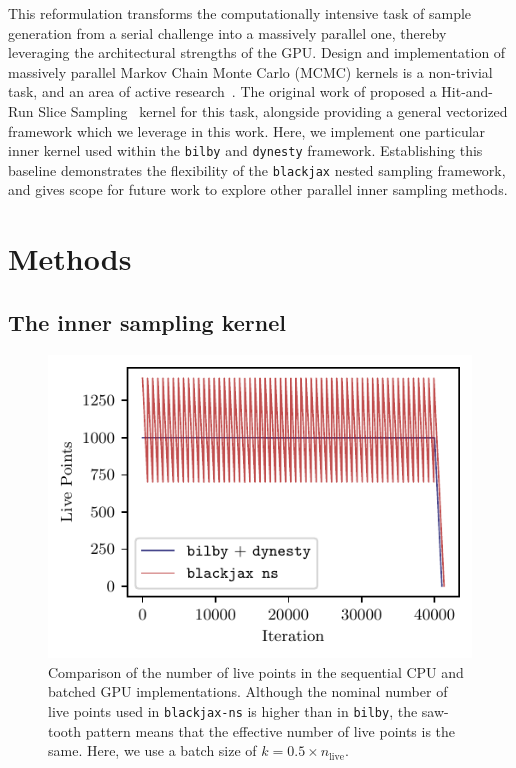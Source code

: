 \documentclass[fleqn,usenatbib]{mnras}
\begin{document}
This reformulation transforms the computationally intensive task of
sample generation from a serial challenge into a massively parallel one,
thereby leveraging the architectural strengths of the GPU. 
Design and implementation of massively parallel Markov Chain Monte Carlo 
(MCMC) kernels is a non-trivial task, and an area of active 
research~\citep{pmlr-v151-hoffman22a,pmlr-v130-hoffman21a}. 
The original work of \cite{yallup2025nested} proposed a 
Hit-and-Run Slice Sampling~\citep{Neal2003_slice} kernel for this task, 
alongside providing a general vectorized framework which we leverage in this work. 
Here, we implement one particular inner kernel used within the \texttt{bilby}
and \texttt{dynesty} framework.
Establishing this baseline demonstrates the flexibility of the \texttt{blackjax} 
nested sampling framework, and gives scope for future work to explore other 
parallel inner sampling methods.

\vspace*{-20pt}
\section{Methods}
\label{sec:methods}

\subsection{The inner sampling kernel}
\label{sec:methods_kernel}

\begin{figure}
    \centering
    \includegraphics{figures/nlive_comparison.pdf}
    \caption{Comparison of the number of live points in the sequential CPU and batched GPU implementations.
    Although the nominal number of live points used in \texttt{blackjax-ns} is higher than in \texttt{bilby},
    the saw-tooth pattern means that the effective number of live points is the same. Here, we use a batch size of $k = 0.5 \times n_{\text{live}}$.}
    \label{fig:nlive_comparison}
\end{figure}
\end{document}
